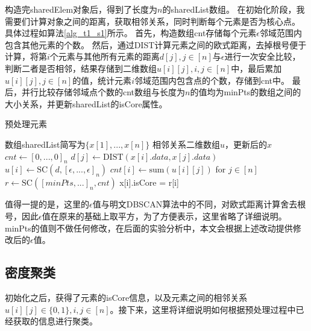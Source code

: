 构造完sharedElem对象后，得到了长度为$ n $的sharedList数组。
在初始化阶段，我需要们计算对象之间的距离，获取相邻关系，同时判断每个元素是否为核心点。
具体过程如算法\ref{alg_t1_s1}所示。
首先，构造数组cnt存储每个元素$ \epsilon $邻域范围内包含其他元素的个数。
然后，通过DIST计算元素之间的欧式距离，去掉根号便于计算，将第$ i $个元素与其他所有元素的距离$ d[j],j\in[n] $与$ \epsilon $进行一次安全比较，判断二者是否相邻，结果存储到二维数组$ u[i][j],i,j\in[n] $中，最后累加$ u[i][j],j\in[n]$的值，统计元素$ i $邻域范围内包含点的个数，存储到cnt中。
最后，并行比较存储邻域点个数的cnt数组与长度为$ n $的值均为minPts的数组之间的大小关系，并更新sharedList的isCore属性。

\begin{algorithm}[htbp]
	\renewcommand{\algorithmicrequire}{\textbf{输入:}}
	\renewcommand{\algorithmicensure}{\textbf{输出:}}
	\caption{预处理元素}
	\label{alg_t1_s1}
	\begin{algorithmic}[1]
		\REQUIRE 数组sharedList简写为$ \{x[1],...,x[n]\} $
		\ENSURE 相邻关系二维数组$ u $，更新后的$ x $
		\STATE $ cnt \leftarrow [0,...,0]_n $
		\STATE $ d[j] \leftarrow \text{DIST}(x[i].data, x[j].data) $
		\ENDFOR
		\STATE $ u[i] \leftarrow \text{SC}(d, [\epsilon,...,\epsilon]_n) $
		\STATE $ cnt[i] \leftarrow \text{sum}(u[i][j])$ for $j \in [n] $
		\ENDFOR
		\STATE $ r \leftarrow \text{SC}([minPts,...]_n,cnt) $
		\STATE x[i].isCore = r[i]
		\ENDFOR
	\end{algorithmic}
\end{algorithm}

值得一提的是，这里的$\epsilon$值与明文DBSCAN算法中的不同，对欧式距离计算舍去根号，因此$\epsilon$值在原来的基础上取平方，为了方便表示，这里省略了详细说明。minPts的值则不做任何修改，在后面的实验分析中，本文会根据上述改动提供修改后的$ \epsilon $值。


\subsection{密度聚类}
\label{t1-julei}
初始化之后，获得了元素的isCore信息，以及元素之间的相邻关系$ u[i][j] \in \{0,1\},i,j\in[n]$。接下来，这里将详细说明如何根据预处理过程中已经获取的信息进行聚类。

